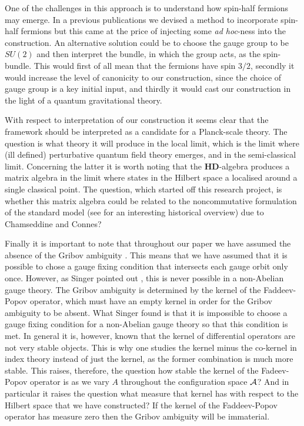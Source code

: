 \documentclass[letterpaper,12pt]{article}
\def\ca{{\cal A}}
\begin{document}
One of the challenges in this approach is to understand how spin-half fermions may emerge. In a previous publications we devised a method to incorporate spin-half fermions but this came at the price of injecting some {\it ad hoc}-ness into the construction. An alternative solution could be to choose the gauge group to be $SU(2)$ and then interpret the bundle, in which the group acts, as the spin-bundle. This would first of all mean that the fermions have spin $3/2$, secondly it would increase the level of canonicity to our construction, since the choice of gauge group is a key initial input, and thirdly it would cast our construction in the light of a quantum gravitational theory. 


With respect to interpretation of our construction it seems clear that the framework should be interpreted as a candidate for a Planck-scale theory. The question is what theory it will produce in the local limit, which is the limit where (ill defined) perturbative quantum field theory emerges, and in the semi-classical limit. Concerning the latter it is worth noting that the $\mathbf{HD}$-algebra produces a matrix algebra in the limit where states in the Hilbert space a localised around a single classical point. The question, which started off this research project, is whether this matrix algebra could be related to the noncommutative formulation of the standard model \cite{Connes:2006qj,Chamseddine:1991qh,Chamseddine:2006ep,Farnsworth:2014vva,Boyle:2016cjt} (see \cite{Chamseddine:2019fjq} for an interesting historical overview) due to Chamseddine and Connes?



Finally it is important to note that throughout our paper we have assumed the absence of the Gribov ambiguity \cite{Gribov:1977wm}. This means that we have assumed that it is possible to chose a gauge fixing condition that intersects each gauge orbit only once. However, as Singer pointed out \cite{Singer:1978dk}, this is never possible in a non-Abelian gauge theory.  
The Gribov ambiguity is determined by the kernel of the Faddeev-Popov operator, which must have an empty kernel in order for the Gribov ambiguity to be absent. What Singer found is that it is impossible to choose a gauge fixing condition for a non-Abelian gauge theory so that this condition is met. 
In general it is, however, known that the kernel of differential operators are not very stable objects. This is why one studies the kernel minus the co-kernel in index theory instead of just the kernel, as the former combination is much more stable. This raises, therefore, the question how stable the kernel of the Fadeev-Popov operator is as we vary $A$ throughout the configuration space $\ca$? And in particular it raises the question what measure that kernel has with respect to the Hilbert space that we have constructed? If the kernel of the Faddeev-Popov operator has measure zero then the Gribov ambiguity will be immaterial. 
\end{document}
